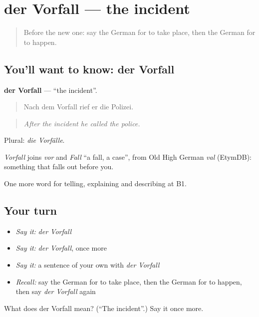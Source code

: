 \section[der Vorfall]{der Vorfall — the incident}

\label{lesson:GE-C279-vorfall}



\begin{quote}
Before the new one: say the German for to take place, then the German for to happen.
\end{quote}

\subsection*{You'll want to know: der Vorfall}
\textbf{der Vorfall} — \textquotedblleft{}the incident\textquotedblright{}.

\begin{quote}
Nach dem Vorfall rief er die Polizei.
\end{quote}

\begin{quote}
\emph{After the incident he called the police.}
\end{quote}

Plural: \emph{die Vorfälle}.

\begin{cousinweb}
\emph{Vorfall} joins \emph{vor} and \emph{Fall} \textquotedblleft{}a fall, a case\textquotedblright{}, from Old High German \emph{val} (EtymDB): something that falls out before you.
\end{cousinweb}

\begin{grammarlens}[title={What you've built}]
One more word for telling, explaining and describing at B1.
\end{grammarlens}

\subsection*{Your turn}
\begin{itemize}
\raggedright
  \item \emph{Say it:} \emph{der Vorfall}
  \item \emph{Say it:} \emph{der Vorfall}, once more
  \item \emph{Say it:} a sentence of your own with \emph{der Vorfall}
  \item \emph{Recall:} say the German for to take place, then the German for to happen, then say \emph{der Vorfall} again
\end{itemize}

\begin{tcolorbox}[breakable,colback=teal!4,colframe=teal!35!black,title={Before you move on}]
What does der Vorfall mean? (\textquotedblleft{}The incident\textquotedblright{}.) Say it once more.
\end{tcolorbox}
